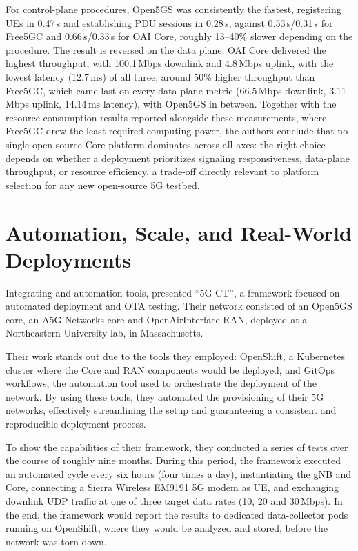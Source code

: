 For control-plane procedures, Open5GS was consistently the fastest, registering \glspl{UE} in 0.47\,s and establishing \gls{PDU} sessions in 0.28\,s, against 0.53\,s/0.31\,s for Free5GC and 0.66\,s/0.33\,s for \gls{OAI} Core, roughly 13--40\% slower depending on the procedure. The result is reversed on the data plane: \gls{OAI} Core delivered the highest throughput, with 100.1\,Mbps downlink and 4.8\,Mbps uplink, with the lowest latency (12.7\,ms) of all three, around 50\% higher throughput than Free5GC, which came last on every data-plane metric (66.5\,Mbps downlink, 3.11\,Mbps uplink, 14.14\,ms latency), with Open5GS in between. Together with the resource-consumption results reported alongside these measurements, where Free5GC drew the least required computing power, the authors conclude that no single open-source Core platform dominates across all axes: the right choice depends on whether a deployment prioritizes signaling responsiveness, data-plane throughput, or resource efficiency, a trade-off directly relevant to platform selection for any new open-source 5G testbed.

\section{Automation, Scale, and Real-World Deployments}
\label{sec:related_automation_scale}

Integrating  and automation tools, \textcite{bonati2025_5gct} presented ``5G-CT'', a framework focused on automated deployment and \gls{OTA} testing. Their network consisted of an Open5GS core, an A5G Networks core and OpenAirInterface \gls{RAN}, deployed at a Northeastern University lab, in Massachusetts.

Their work stands out due to the tools they employed: OpenShift, a Kubernetes cluster where the Core and \gls{RAN} components would be deployed, and GitOps workflows, the automation tool used to orchestrate the deployment of the network. By using these tools, they automated the provisioning of their 5G networks, effectively streamlining the setup and guaranteeing a consistent and reproducible deployment process.

To show the capabilities of their framework, they conducted a series of tests over the course of roughly nine months. During this period, the framework executed an automated cycle every six hours (four times a day), instantiating the \gls{gNB} and Core, connecting a Sierra Wireless EM9191 5G modem as \gls{UE}, and exchanging downlink UDP traffic at one of three target data rates (10, 20 and 30\,Mbps). In the end, the framework would report the results to dedicated data-collector pods running on OpenShift, where they would be analyzed and stored, before the network was torn down.

